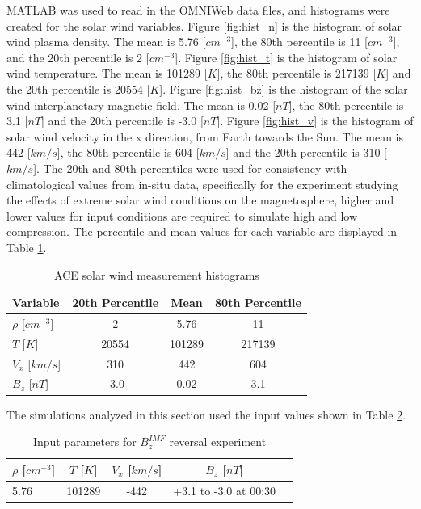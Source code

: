 MATLAB was used to read in the OMNIWeb data files, and histograms were created
for the solar wind variables. Figure \ref{fig:hist_n} is the histogram of solar
wind plasma density. The mean is 5.76 [$cm^{-3}$], the 80th percentile is 11
[$cm^{-3}$], and the 20th percentile is 2 [$cm^{-3}$]. Figure \ref{fig:hist_t}
is the histogram of solar wind temperature. The mean is 101289 [$K$], the 80th
percentile is 217139 [$K$] and the 20th percentile is 20554 [$K$]. Figure
\ref{fig:hist_bz} is the histogram of the solar wind interplanetary magnetic
field. The mean is 0.02 [$nT$], the 80th percentile is 3.1 [$nT$] and the 20th
percentile is -3.0 [$nT$]. Figure \ref{fig:hist_v} is the histogram of solar
wind velocity in the x direction, from Earth towards the Sun. The mean is 442 [$km/s$], the 80th percentile is 604 [$km/s$]
and the 20th percentile is 310 [$km/s$]. The 20th and 80th percentiles were used
for consistency with climatological values from in-situ data, specifically for
the experiment studying the effects of extreme solar wind conditions on the magnetosphere, higher and lower values for input
conditions are required to simulate high and low compression.
The percentile and mean values for each variable are displayed in Table
\ref{table:histtable}.

\begin{table}
\begin{center}
  \caption{ACE solar wind measurement histograms}
  \begin{tabular}{| l | c | c | c | }
    \hline
    \textbf{Variable} & \textbf{20th Percentile} & \textbf{Mean} &
    \textbf{80th Percentile} \\
    \hline $\rho$ [$cm^{-3}$] & 2 & 5.76  & 11   \\ \hline
    $T$ [$K$] & 20554 & 101289  & 217139 \\ \hline
    $V_x$ [$km/s$] & 310 & 442 & 604 \\ \hline
    $B_z$ [$nT$] & -3.0 & 0.02 & 3.1 \\ \hline
  \end{tabular}
  \label{table:histtable}
\end{center}
\end{table}

The simulations analyzed in this section used the input values shown in Table
\ref{table:run1}.

\begin{table}
\begin{center}
  \caption{Input parameters for $B_z^{IMF}$ reversal experiment}
  \begin{tabular}{| l | c | c | c | c | }
    \hline
    \textbf{$\rho$} [$cm^{-3}$] & \textbf{$T$} [$K$] &
    \textbf{$V_x$} [$km/s$] &
    \textbf{$B_z$} [$nT$]
    \\
    \hline 
    5.76 & 101289 & -442  & +3.1 to -3.0 at 00:30 \\ \hline
  \end{tabular}
  \label{table:run1}
\end{center}
\end{table}

